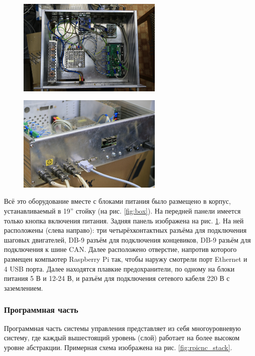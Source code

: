 \documentclass[14pt,russian,a4paper]{extarticle}
\begin{document}
\begin{figure}[h!]
\centering
\begin{minipage}[t]{200pt}
    \centering
    \includegraphics[width=200pt]{media/box.jpg}
    \label{fig:box}
\end{minipage}%
\hspace{20pt}
\begin{minipage}[t]{200pt}
    \centering
    \includegraphics[width=200pt]{media/box_back.jpg}
    \label{fig:box_back}
\end{minipage}
\end{figure}

Всё это оборудование вместе с блоками питания было размещено в корпус, устанавливаемый в 19'' стойку (на рис. \ref{fig:box}). На передней панели имеется только кнопка включения питания.
Задняя панель изображена на рис. \ref{fig:box_back}. На ней расположены (слева направо): три четырёхконтактных разъёма для подключения шаговых двигателей, DB-9 разъём для подключения концевиков, DB-9 разьём для подключения к шине CAN. Далее расположено отверстие, напротив которого размещен компьютер  Raspberry Pi так, чтобы наружу смотрели порт Ethernet и 4 USB порта. Далее находятся плавкие предохранители, по одному на блоки питания 5 В и 12-24 В, и разъём для подключения сетевого кабеля 220 В с заземлением.

\subsubsection{Программная часть}
Программная часть системы управления представляет из себя многоуровневую систему, где каждый вышестоящий уровень (слой) работает на более высоком уровне абстракции. Примерная схема изображена на рис. \ref{fig:rpicnc_stack}.
\newline
\end{document}
